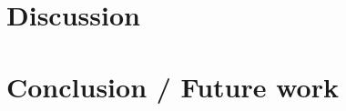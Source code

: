 \documentclass[10pt,journal,compsoc]{IEEEtran}
\begin{document}

\section{Discussion}

\section{Conclusion / Future work}



\end{document}

